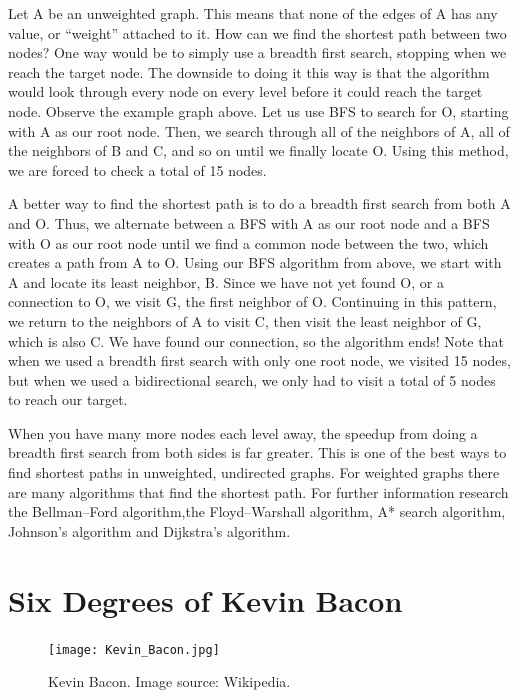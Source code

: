 Let A be an unweighted graph. This means that none of the edges of A has any value, or ``weight'' attached to it. How can we find the shortest path between two nodes? 
One way would be to simply use a breadth first search, stopping when we reach the target node. The downside to doing it this way is that the algorithm would look through 
every node on every level before it could reach the target node. Observe the example graph above. Let us use BFS to search for O, starting with A as our root node. 
Then, we search through all of the neighbors of A,  all of the neighbors of B and C, and so on until we finally locate O. Using this method, we are forced to check 
a total of 15 nodes.

A better way to find the shortest path is to do a breadth first search from both A and O. Thus, we alternate between a BFS with A as our root node and a BFS with O 
as our root node until we find a common node between the two, which creates a path from A to O.  Using our BFS algorithm from above, we start with A and locate its 
least neighbor, B. Since we have not yet found O, or a connection to O, we visit G, the first neighbor of O. Continuing in this pattern, we return to the neighbors 
of A to visit C, then visit the least neighbor of G, which is also C. We have found our connection, so the algorithm ends! Note that when we used a breadth first 
search with only one root node, we visited 15 nodes, but when we used a bidirectional search, we only had to visit a total of 5 nodes to reach our target.

When you have many more nodes each level away, the speedup from doing a breadth first search from both sides is far greater. This is one of the best ways to find shortest 
paths in unweighted, undirected graphs. For weighted graphs there are many algorithms that find the shortest path. For further information research  
the Bellman–Ford algorithm,the Floyd–Warshall algorithm, A* search algorithm, Johnson's algorithm and Dijkstra's algorithm.

\section*{Six Degrees of Kevin Bacon}
\begin{figure}[h]
\texttt{[image: Kevin\_Bacon.jpg]}
\caption{Kevin Bacon.  Image source: Wikipedia.}
\end{figure}


